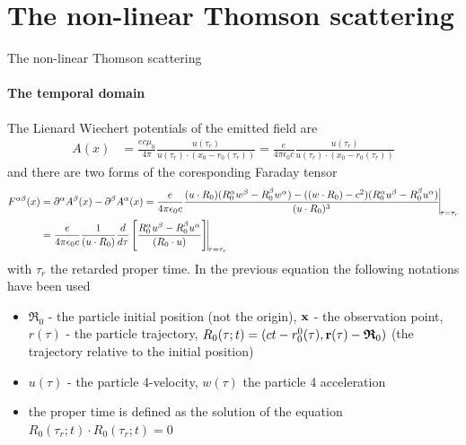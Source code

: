 \documentclass[aspectratio=169, 10pt]{beamer}
\begin{document}
\section{The non-linear Thomson scattering}
\begin{frame}{The non-linear Thomson scattering}
  \framesubtitle{The temporal domain}
  The Lienard Wiechert potentials of the emitted field are
  \begin{align*}
    A(x) & =\frac{ec\mu_0}{4\pi}\frac{u(\tau_r)}{u(\tau_r)\cdot(x_0-r_0(\tau_r))}=\frac{e}{4\pi\epsilon_0c}\frac{u(\tau_r)}{u(\tau_r)\cdot(x_0-r_0(\tau_r))}
  \end{align*}
  and there are two forms of the coresponding Faraday tensor
  \begin{align*}
    F^{\alpha\beta}(x) & =\partial^{\alpha}A^{\beta}(x)-\partial^{\beta}A^{\alpha}(x) ={\frac{e}{4\pi\epsilon_0c}\frac{(u\cdot R_0)(R_0^{\alpha}w^{\beta}-R_0^{\beta}w^{\alpha})-((w\cdot R_0)-c^2)(R_0^{\alpha}u^{\beta}-R_0^{\beta}u^{\alpha})}{(u\cdot R_0)^3}  \vline}_{\tau=\tau_r}\\
    &={\frac{e}{4\pi\epsilon_0c}\frac1{(u\cdot R_0)}\frac{d}{d\tau}\left[\frac{R_0^{\alpha}u^{\beta}-R_0^{\beta}u^{\alpha}}{(R_0\cdot u)}\right]\vline}_{\tau=\tau_r}
  \end{align*}
  with $\tau_r$ the retarded proper time. In the previous equation the following notations have been used
  \begin{itemize}
    \item $\boldsymbol{\mathfrak R}_0$ - the particle initial position (not the origin), ${\bf x}$ - the observation point, $r(\tau)$ - the particle trajectory, $R_0(\tau;t) = (ct-{r}^0_0(\tau), {\bf r}(\tau)-{\boldsymbol{\mathfrak R}}_0)$ (the trajectory relative to the initial position)
    \item $u(\tau)$ - the particle 4-velocity, $w(\tau)$ the particle 4 acceleration
    \item the proper time is defined as the solution of the equation $R_0(\tau_r;t)\cdot R_{0}{(\tau_r;t)}=0$
  \end{itemize}

\end{frame}
\end{document}
